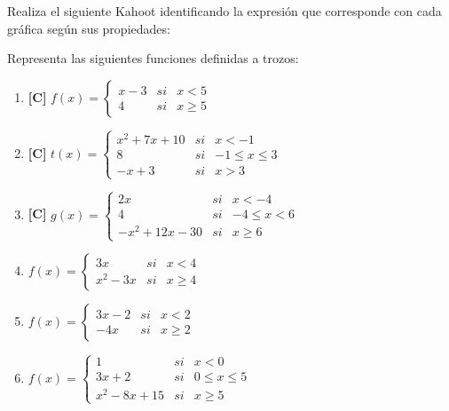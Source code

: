 \Exercicio Realiza el siguiente Kahoot identificando la expresión que corresponde con cada gráfica según sus propiedades:

\begin{center}
\end{center}


\Exercicio Representa las siguientes funciones definidas a trozos:

\begin{enumerate}[topsep=0pt]
	\item \textbf{[C]} $f(x) =
		\left\{
			\begin{array}{lcc}
				x - 3 &   si  & x < 5 \\
				4 &  si & x \ge 5
			\end{array}
		\right.$
	\item \textbf{[C]} $t(x) = 
		\left\{
			\begin{array}{lcc}
				x^2 +7x + 10 &   si  & x < -1 \\
				8 &  si & -1 \le x \le 3 \\
				-x + 3 & si & x > 3
			\end{array}
		\right.$
	\item \textbf{[C]} $g(x) = 
		\left\{
			\begin{array}{lcc}
				2x &   si  & x < -4 \\
				4 &  si & -4 \le x < 6 \\
				-x^2 +12x -30 & si & x \ge 6
			\end{array}
		  \right.$
		  
		  
	\item $f(x) = 
		\left\{
		\begin{array}{lcc}
			3x &   si  & x < 4 \\
			x^2 - 3x &    si &  x \ge 4  
		\end{array}
		\right.$		  
	
	\item $f(x) = 
		\left\{
		\begin{array}{lcc}
			3x -2  &   si    & x < 2 \\
			-4x &    si &  x \ge 2  
		\end{array}
		\right.$
		  
	\item $f(x) = 
		\left\{
		\begin{array}{lcc}
			1             &   si  & x < 0 \\
			3x + 2        &   si  & 0 \le x \le 5 \\
			x^2 - 8x + 15 &   si  & x \ge 5
		\end{array}
		\right.$
			  

\end{enumerate}
